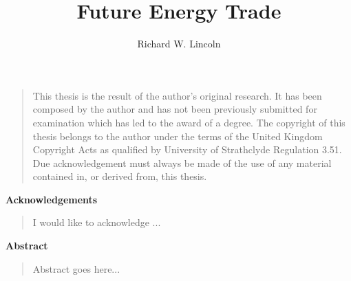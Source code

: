 \documentclass[oneside,11pt]{strath_thesis}
\title{Future Energy Trade}
\author{Richard W. Lincoln}
\begin{document}
\maketitle
\newpage

\setcounter{page}{1}

\thispagestyle{plain}
\begin{quote}
This thesis is the result of the author's original research.  It has been
composed by the author and has not been previously submitted for examination
which has led to the award of a degree.
The copyright of this thesis belongs to the author under the terms of the
United Kingdom Copyright Acts as qualified by University of Strathclyde
Regulation 3.51. Due acknowledgement must always be made of the use of any
material contained in, or derived from, this thesis.
\end{quote}
\newpage

\thispagestyle{plain}
\begin{center}
\vspace*{1.5cm}
{\Large \bfseries Acknowledgements}
\end{center}
\vspace{0.5cm}
\begin{quote}
I would like to acknowledge ...
\end{quote}
\newpage

\thispagestyle{plain}
\begin{center}
  \vspace*{1.5cm}
  {\Large \bfseries  Abstract}
\end{center}
\vspace{0.5cm}
\begin{quote}
Abstract goes here...
\end{quote}

\tableofcontents
\newpage
\listoffigures
\newpage
\listoftables
\newpage
{}
\setcounter{page}{1}









%








\end{document}

